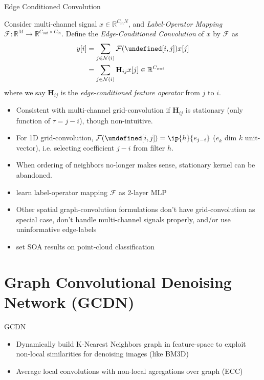 \documentclass{beamer}
\newcommand{\R}{\mathbb R}
\newcommand{\N}{\mathcal N} %
\let\L\undefined
\newcommand{\L}{\mathcal L} %
\begin{document}
\begin{frame}[allowframebreaks]{Edge Conditioned Convolution}
\begin{definition}
Consider multi-channel  signal $x \in \R^{C_{in}N}$, 
and \textit{Label-Operator Mapping} $\mathcal{F}: \R^{M} \rightarrow \R^{C_{out}\times C_{in}}$. 
Define the \textit{Edge-Conditioned Convolution} of $x$ by $\mathcal{F}$ as
\begin{align}
y[i] &= \sum_{j \in \N(i)} \mathcal{F}(\L[i,j])x[j] \\
&= \sum_{j \in \N(i)} \mathbf{H}_{ij}x[j] \in \R^{C_{out}}
\end{align}
where we say $\mathbf{H}_{ij}$ is the \textit{edge-conditioned feature operator} from $j$ to $i$.
\end{definition}

\begin{itemize}
\item Consistent with multi-channel grid-convolution if $\mathbf{H}_{ij}$ is stationary 
(only function of $\tau = j-i$), though non-intuitive.
\end{itemize}

\newpage

\begin{itemize}
\item For 1D grid-convolution, $\mathcal{F}(\L[i,j]) = \ip{h}{e_{j-i}}$ ($e_k$ dim $k$ unit-vector), 
i.e. selecting coefficient $j-i$ from filter $h$.
\item When ordering of neighbors no-longer makes sense, stationary kernel can be abandoned. 
\item \cite{Simonovsky2017ecc} learn label-operator mapping $\mathcal{F}$ as 2-layer MLP
\item Other spatial graph-convolution formulations don't have grid-convolution as special case, 
don't handle multi-channel signals properly, and/or use uninformative edge-labels
\item \cite{Simonovsky2017ecc} set SOA results on point-cloud classification
\end{itemize}
\end{frame}

\section{Graph Convolutional Denoising Network (GCDN)}
\begin{frame}{GCDN}
\begin{itemize}
\item Dynamically build K-Nearest Neighbors graph in feature-space 
to exploit non-local similarities for denoising images (like BM3D)
\item Average local convolutions with non-local agregations over graph (ECC)
\end{itemize}
\end{frame}
\end{document}
